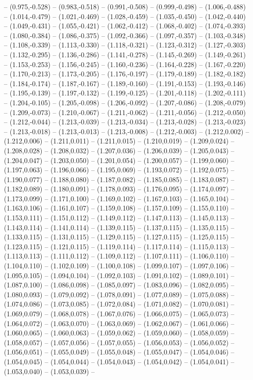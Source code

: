 -- (0.975,-0.528) -- (0.983,-0.518) -- (0.991,-0.508) -- (0.999,-0.498) -- (1.006,-0.488) -- (1.014,-0.479) -- (1.021,-0.469) -- (1.028,-0.459) -- (1.035,-0.450) -- (1.042,-0.440) -- (1.049,-0.431) -- (1.055,-0.421) -- (1.062,-0.412) -- (1.068,-0.402) -- (1.074,-0.393) -- (1.080,-0.384) -- (1.086,-0.375) -- (1.092,-0.366) -- (1.097,-0.357) -- (1.103,-0.348) -- (1.108,-0.339) -- (1.113,-0.330) -- (1.118,-0.321) -- (1.123,-0.312) -- (1.127,-0.303) -- (1.132,-0.295) -- (1.136,-0.286) -- (1.141,-0.278) -- (1.145,-0.269) -- (1.149,-0.261) -- (1.153,-0.253) -- (1.156,-0.245) -- (1.160,-0.236) -- (1.164,-0.228) -- (1.167,-0.220) -- (1.170,-0.213) -- (1.173,-0.205) -- (1.176,-0.197) -- (1.179,-0.189) -- (1.182,-0.182) -- (1.184,-0.174) -- (1.187,-0.167) -- (1.189,-0.160) -- (1.191,-0.153) -- (1.193,-0.146) -- (1.195,-0.139) -- (1.197,-0.132) -- (1.199,-0.125) -- (1.201,-0.118) -- (1.202,-0.111) -- (1.204,-0.105) -- (1.205,-0.098) -- (1.206,-0.092) -- (1.207,-0.086) -- (1.208,-0.079) -- (1.209,-0.073) -- (1.210,-0.067) -- (1.211,-0.062) -- (1.211,-0.056) -- (1.212,-0.050) -- (1.212,-0.044) -- (1.213,-0.039) -- (1.213,-0.034) -- (1.213,-0.028) -- (1.213,-0.023) -- (1.213,-0.018) -- (1.213,-0.013) -- (1.213,-0.008) -- (1.212,-0.003) -- (1.212,0.002) -- (1.212,0.006) -- (1.211,0.011) -- (1.211,0.015) -- (1.210,0.019) -- (1.209,0.024) -- (1.208,0.028) -- (1.208,0.032) -- (1.207,0.036) -- (1.206,0.039) -- (1.205,0.043) -- (1.204,0.047) -- (1.203,0.050) -- (1.201,0.054) -- (1.200,0.057) -- (1.199,0.060) -- (1.197,0.063) -- (1.196,0.066) -- (1.195,0.069) -- (1.193,0.072) -- (1.192,0.075) -- (1.190,0.077) -- (1.188,0.080) -- (1.187,0.082) -- (1.185,0.085) -- (1.183,0.087) -- (1.182,0.089) -- (1.180,0.091) -- (1.178,0.093) -- (1.176,0.095) -- (1.174,0.097) -- (1.173,0.099) -- (1.171,0.100) -- (1.169,0.102) -- (1.167,0.103) -- (1.165,0.104) -- (1.163,0.106) -- (1.161,0.107) -- (1.159,0.108) -- (1.157,0.109) -- (1.155,0.110) -- (1.153,0.111) -- (1.151,0.112) -- (1.149,0.112) -- (1.147,0.113) -- (1.145,0.113) -- (1.143,0.114) -- (1.141,0.114) -- (1.139,0.115) -- (1.137,0.115) -- (1.135,0.115) -- (1.133,0.115) -- (1.131,0.115) -- (1.129,0.115) -- (1.127,0.115) -- (1.125,0.115) -- (1.123,0.115) -- (1.121,0.115) -- (1.119,0.114) -- (1.117,0.114) -- (1.115,0.113) -- (1.113,0.113) -- (1.111,0.112) -- (1.109,0.112) -- (1.107,0.111) -- (1.106,0.110) -- (1.104,0.110) -- (1.102,0.109) -- (1.100,0.108) -- (1.099,0.107) -- (1.097,0.106) -- (1.095,0.105) -- (1.094,0.104) -- (1.092,0.103) -- (1.091,0.102) -- (1.089,0.101) -- (1.087,0.100) -- (1.086,0.098) -- (1.085,0.097) -- (1.083,0.096) -- (1.082,0.095) -- (1.080,0.093) -- (1.079,0.092) -- (1.078,0.091) -- (1.077,0.089) -- (1.075,0.088) -- (1.074,0.086) -- (1.073,0.085) -- (1.072,0.084) -- (1.071,0.082) -- (1.070,0.081) -- (1.069,0.079) -- (1.068,0.078) -- (1.067,0.076) -- (1.066,0.075) -- (1.065,0.073) -- (1.064,0.072) -- (1.063,0.070) -- (1.063,0.069) -- (1.062,0.067) -- (1.061,0.066) -- (1.060,0.065) -- (1.060,0.063) -- (1.059,0.062) -- (1.059,0.060) -- (1.058,0.059) -- (1.058,0.057) -- (1.057,0.056) -- (1.057,0.055) -- (1.056,0.053) -- (1.056,0.052) -- (1.056,0.051) -- (1.055,0.049) -- (1.055,0.048) -- (1.055,0.047) -- (1.054,0.046) -- (1.054,0.045) -- (1.054,0.044) -- (1.054,0.043) -- (1.054,0.042) -- (1.054,0.041) -- (1.053,0.040) -- (1.053,0.039) -- 